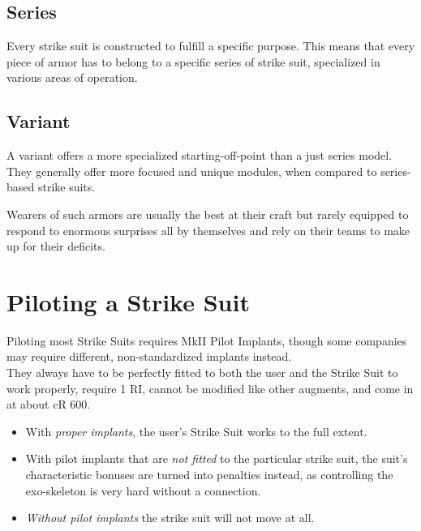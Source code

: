 \documentclass[12pt,a4paper,openany,usenames,dvipsnames]{book}
\begin{document}
	\section{Series}
	Every strike suit is constructed to fulfill a specific purpose. This means that every piece of armor has to belong to a specific series of strike suit, specialized in various areas of operation.
	
    \begin{multicols}{2}
    	\raggedcolumns
    \end{multicols}
    
    \pagebreak
    \section{Variant}
    A variant offers a more specialized starting-off-point than a just series model.
    They generally offer more focused and unique modules, when compared to series-based strike suits.
    \par
    Wearers of such armors are usually the best at their craft but rarely equipped to respond to enormous surprises all by themselves and rely on their teams to make up for their deficits.
    \par
    
    \begin{multicols}{2}
    	\raggedcolumns
    \end{multicols}
    
    \chapter{Piloting a Strike Suit}
    Piloting most Strike Suits requires MkII Pilot Implants, though some companies may require different, non-standardized implants instead.\\
    They always have to be perfectly fitted to both the user and the Strike Suit to work properly, require 1 RI, cannot be modified like other augments, and come in at about cR 600.\\
    \begin{itemize}
    	\item With \emph{proper implants}, the user's Strike Suit works to the full extent.
    	\item With pilot implants that are \emph{not fitted} to the particular strike suit, the suit's characteristic bonuses are turned into penalties instead, as controlling the exo-skeleton is very hard without a connection.
    	\item \emph{Without pilot implants} the strike suit will not move at all.
    \end{itemize}
    
\end{document}
